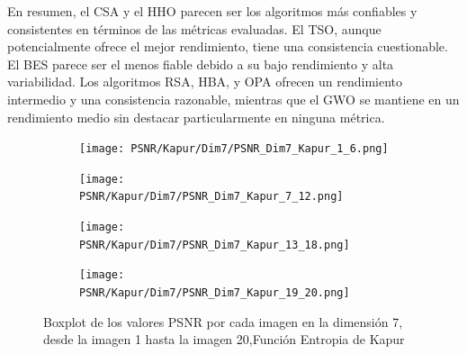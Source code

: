 \documentclass[conference]{IEEEtran}
\begin{document}
\noindent En resumen, el CSA y el HHO parecen ser los algoritmos más confiables y consistentes en términos de las métricas evaluadas. El TSO, aunque potencialmente ofrece el mejor rendimiento, tiene una consistencia cuestionable. El BES parece ser el menos fiable debido a su bajo rendimiento y alta variabilidad. Los algoritmos RSA, HBA, y OPA ofrecen un rendimiento intermedio y una consistencia razonable, mientras que el GWO se mantiene en un rendimiento medio sin destacar particularmente en ninguna métrica.
\begin{figure}[htbp]
	\centering
	\begin{subfigure}{0.4\textwidth}
		\texttt{[image: PSNR/Kapur/Dim7/PSNR\_Dim7\_Kapur\_1\_6.png]}
	\end{subfigure}
	
	\begin{subfigure}{0.4\textwidth}
		\texttt{[image: PSNR/Kapur/Dim7/PSNR\_Dim7\_Kapur\_7\_12.png]}
	\end{subfigure}
	\begin{subfigure}{0.4\textwidth}
		\texttt{[image: PSNR/Kapur/Dim7/PSNR\_Dim7\_Kapur\_13\_18.png]}
	\end{subfigure}  
	\begin{subfigure}{0.4\textwidth}
		\texttt{[image: PSNR/Kapur/Dim7/PSNR\_Dim7\_Kapur\_19\_20.png]}
		\vspace{-120pt} %
	\end{subfigure}
	\caption{Boxplot de los valores PSNR por cada imagen en la dimensión 7, desde la imagen 1 hasta la imagen 20,Función Entropia de Kapur}
	\label{fig:imagenes}    
\end{figure}
\end{document}
